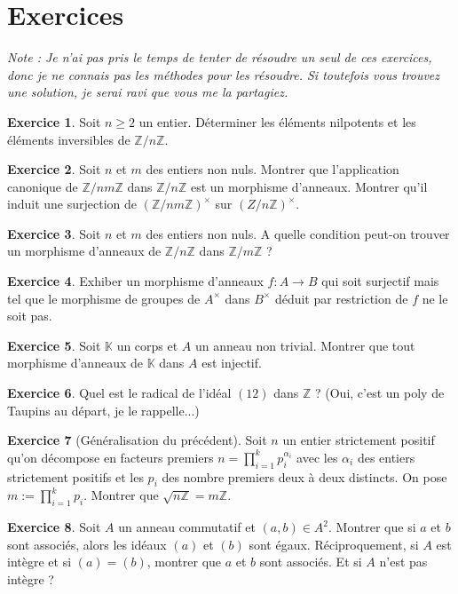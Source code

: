 \documentclass[french]{book}
\newcommand{\Z}{\mathbb{Z}}
\newcommand{\K}{\mathbb{K}}
\theoremstyle{plain}
\theoremstyle{definition}
\newtheorem{exe}{Exercice}[chapter]
\theoremstyle{remark}
\begin{document}
\section{Exercices}
\textit{Note : Je n'ai pas pris le temps de tenter de résoudre un seul de ces exercices, donc je ne connais pas les méthodes pour les résoudre. Si toutefois vous trouvez une solution, je serai ravi que vous me la partagiez.}
\begin{exe}
	Soit $n\geqslant2$ un entier. Déterminer les éléments nilpotents et les éléments inversibles de $\Z/n\Z$.
\end{exe}
\begin{exe}
	Soit $n$ et $m$ des entiers non nuls. Montrer que l'application canonique de $\Z/nm\Z$ dans $\Z/n\Z$ est un morphisme d'anneaux. Montrer qu'il induit une surjection de $\left(\Z/nm\Z\right)^\times$ sur $\left(Z/n\Z\right)^\times$.
\end{exe}
\begin{exe}
	Soit $n$ et $m$ des entiers non nuls. A quelle condition peut-on trouver un morphisme d'anneaux de $\Z/n\Z$ dans $\Z/m\Z$ ?
\end{exe}
\begin{exe}
	Exhiber un morphisme d'anneaux $f:A\rightarrow B$ qui soit surjectif mais tel que le morphisme de groupes de $A^\times$ dans $B^\times$ déduit par restriction de $f$ ne le soit pas.
\end{exe}
\begin{exe}
	Soit $\K$ un corps et $A$ un anneau non trivial. Montrer que tout morphisme d'anneaux de $\K$ dans $A$ est injectif.
\end{exe}
\begin{exe}
	Quel est le radical de l'idéal $(12)$ dans $\Z$ ? (Oui, c'est un poly de Taupins au départ, je le rappelle...)
\end{exe}
\begin{exe}[Généralisation du précédent]
	Soit $n$ un entier strictement positif qu'on décompose en facteurs premiers $n=\displaystyle\prod_{i=1}^{k}p_i^{\alpha_i}$ avec les $\alpha_i$ des entiers strictement positifs et les $p_i$ des nombre premiers deux à deux distincts. On pose $m:=\displaystyle\prod_{i=1}^{k}p_i$. Montrer que $\sqrt{n\Z}=m\Z$.
\end{exe}
\begin{exe}
	Soit $A$ un anneau commutatif et $(a,b)\in A^2$. Montrer que si $a$ et $b$ sont associés, alors les idéaux $(a)$ et $(b)$ sont égaux. Réciproquement, si $A$ est intègre et si $(a)=(b)$, montrer que $a$ et $b$ sont associés. Et si $A$ n'est pas intègre ?
\end{exe}
\end{document}

